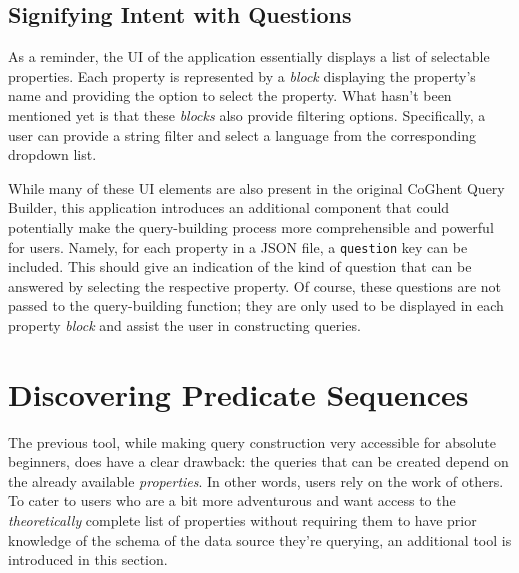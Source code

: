 \subsection{Signifying Intent with Questions}

As a reminder, the UI of the application essentially displays a list of selectable properties. Each property is represented by a \textit{block} displaying the property's name and providing the option to select the property. What hasn't been mentioned yet is that these \textit{blocks} also provide filtering options. Specifically, a user can provide a string filter and select a language from the corresponding dropdown list.

While many of these UI elements are also present in the original CoGhent Query Builder, this application introduces an additional component that could potentially make the query-building process more comprehensible and powerful for users. Namely, for each property in a JSON file, a \texttt{question} key can be included. This should give an indication of the kind of question that can be answered by selecting the respective property. Of course, these questions are not passed to the query-building function; they are only used to be displayed in each property \textit{block} and assist the user in constructing queries.

\section{Discovering Predicate Sequences}
\label{sec:discovering_predicate_sequences}

The previous tool, while making query construction very accessible for absolute beginners, does have a clear drawback: the queries that can be created depend on the already available \textit{properties}. In other words, users rely on the work of others. To cater to users who are a bit more adventurous and want access to the \textit{theoretically} complete list of properties without requiring them to have prior knowledge of the schema of the data source they're querying, an additional tool is introduced in this section.

